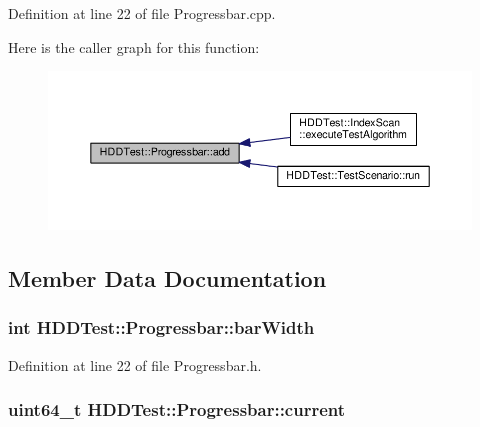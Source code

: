 Definition at line 22 of file Progressbar.\-cpp.



Here is the caller graph for this function\-:
\nopagebreak
\begin{figure}[H]
\begin{center}
\leavevmode
\includegraphics[width=350pt]{class_h_d_d_test_1_1_progressbar_a031bb6b1e7a3305d441bc10353c37966_icgraph}
\end{center}
\end{figure}




\subsection{Member Data Documentation}
\hypertarget{class_h_d_d_test_1_1_progressbar_a754f1137a1b68fced60aebfc87269a84}{
\subsubsection[{bar\-Width}]{\setlength{\rightskip}{0pt plus 5cm}int H\-D\-D\-Test\-::\-Progressbar\-::bar\-Width}}\label{class_h_d_d_test_1_1_progressbar_a754f1137a1b68fced60aebfc87269a84}


Definition at line 22 of file Progressbar.\-h.

\hypertarget{class_h_d_d_test_1_1_progressbar_a8064f75e6a8ad05753bbff8752d6a5a7}{
\subsubsection[{current}]{\setlength{\rightskip}{0pt plus 5cm}uint64\-\_\-t H\-D\-D\-Test\-::\-Progressbar\-::current}}\label{class_h_d_d_test_1_1_progressbar_a8064f75e6a8ad05753bbff8752d6a5a7}


